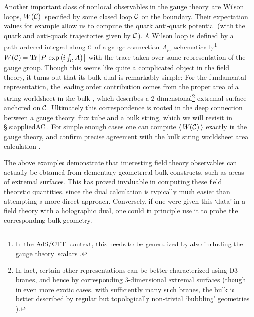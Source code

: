 \documentclass[12pt]{article}
\def\sect#1{\S\ref{#1}}
\def\AC{AdS/CFT}
\def\GT{gauge theory}
\def\vev#1{\langle\, #1 \, \rangle}
\begin{document}
Another important class of nonlocal observables in the \GT\ are  Wilson loops, $W({\cal C})$, specified by some closed loop ${\cal C}$ on the boundary.  Their expectation values for example allow us to compute the quark anti-quark potential (with the quark and anti-quark trajectories given by ${\cal C}$).
A Wilson loop is defined by a path-ordered integral along ${\cal C}$ of a gauge connection $A_{\mu}$, schematically\footnote{
In the \AC\ context, this needs to be generalized  by also including the \GT\ scalars \cite{Maldacena:1998im}. 
}
$W({\cal C}) = {\rm Tr} \left[ P \, \exp \left( i \oint_{\cal C} A \right) \right]
$
with the trace taken over some representation of the gauge group.  
Though this seems like quite a complicated object in the field theory, it turns out that its bulk dual is remarkably simple:
For the fundamental representation, the leading order contribution comes from the proper area of a string worldsheet in the bulk \cite{Maldacena:1998im}, which describes a 2-dimensional\footnote{
In fact, certain other representations can be better characterized using D3-branes, and hence by corresponding 3-dimensional extremal surfaces \cite{Drukker:2005kx} (though in even more exotic cases, with sufficiently many such branes, the bulk is better described by regular but topologically non-trivial `bubbling' geometries \cite{Lunin:2006xr}).
} extremal surface anchored on ${\cal C}$.  
Ultimately this correspondence is rooted in the deep connection between a \GT\ flux tube and a bulk string, which we will revisit in \sect{s:appliedAC}.
For simple enough cases one can compute $\vev{W({\cal C})}$ exactly in the \GT, and confirm precise agreement with the bulk string worldsheet area calculation \cite{Drukker:2000rr}.

The above examples demonstrate that interesting field theory observables can actually be obtained from elementary geometrical bulk constructs,  such as areas of extremal surfaces.  This has proved invaluable in computing these field theoretic quantities, since the dual calculation is typically much easier than attempting a more direct approach.  Conversely, if one were given this  `data' in a field theory with a holographic dual, one could in principle use it to probe the corresponding bulk geometry.  
\end{document}
